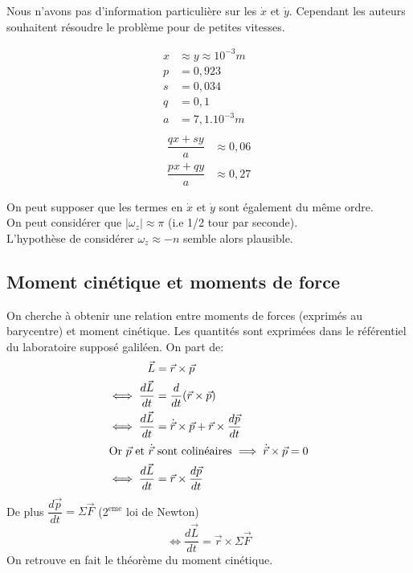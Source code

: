 \documentclass[12pt,a4paper]{article}
\begin{document}
	
	Nous n'avons pas d'information particulière sur les $\dot{x}$ et $\dot{y}$. Cependant les auteurs souhaitent résoudre le problème pour de petites vitesses.
	
	\begin{multicols}{2}
		\noindent
		\begin{align*}
		x&\approx y \approx 10^{-3}m&\\
		p&=0,923&\\
		s&=0,034&\\
		q&=0,1&\\
		a&=7,1.10^{-3}m&\\
		\end{align*}
		\columnbreak
		\begin{align*}
		\dfrac{qx+sy}{a}&\approx0,06\\[2em]
		\dfrac{px+qy}{a}&\approx0,27
		\end{align*}
	\end{multicols}
	\vspace*{-3em}
	On peut supposer que les termes en $\dot{x}$ et $\dot{y}$ sont également du même ordre.\\
	On peut considérer que $|\omega_z|\approx\pi$ (i.e 1/2 tour par seconde).\\
	L'hypothèse de considérer $\omega_z\approx-n$ semble alors plausible.
	
	
	
	\subsection{Moment cinétique et moments de force}
	\label{subsec:moments}
	On cherche à obtenir une relation entre moments de forces (exprimés au barycentre) et moment cinétique. Les quantités sont exprimées dans le référentiel du laboratoire supposé galiléen.
	On part de:
	\begin{align*}
	\vec{L}     &= \vec{r}\times \vec{p}\\
	\iff\dfrac{d\vec{L}}{dt} &= \dfrac{d}{dt}(\vec{r}\times \vec{p})\\
	\iff\dfrac{d\vec{L}}{dt} &= \dot{\vec{r}}\times \vec{p}+\vec{r}\times \dfrac{d\vec{p}}{dt}\\
	\intertext{Or $\vec{p}$ et $\dot{\vec{r}}$ sont colinéaires $\implies \dot{\vec{r}}\times \vec{p} = 0$}
	\iff\dfrac{d\vec{L}}{dt} &= \vec{r}\times \dfrac{d\vec{p}}{dt}
	\end{align*}
	De plus $\dfrac{d\vec{p}}{dt}=\Sigma\vec{F}$ (2$^{\mathrm{eme}}$ loi de Newton)
	\begin{equation}
	\iff\dfrac{d\vec{L}}{dt} = \vec{r}\times\Sigma\vec{F}
	\end{equation}
	On retrouve en fait le théorème du moment cinétique.
	
\end{document}
